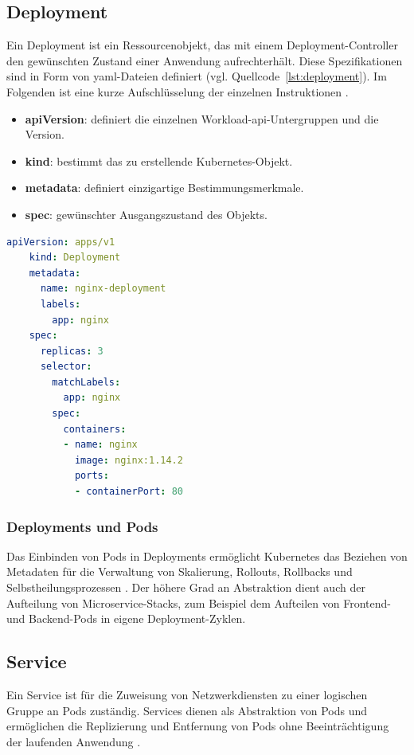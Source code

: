 \subsection{Deployment}
Ein Deployment ist ein Ressourcenobjekt, das mit einem Deployment-Controller den gewünschten Zustand einer Anwendung aufrechterhält.
Diese Spezifikationen sind in Form von \acs{yaml}-Dateien definiert (vgl. Quellcode~\ref{lst:deployment}).
Im Folgenden ist eine kurze Aufschlüsselung der einzelnen Instruktionen \cite{kubernetesobjects}.
\begin{itemize}
    \item \textbf{\acs{api}Version}: definiert die einzelnen Workload-\acs{api}-Untergruppen und die Version.
    \item \textbf{kind}: bestimmt das zu erstellende Kubernetes-Objekt.
    \item \textbf{metadata}: definiert einzigartige Bestimmungsmerkmale.
    \item \textbf{spec}: gewünschter Ausgangszustand des Objekts.
\end{itemize}

\begin{lstlisting}[caption={deployment.yaml \cite{kubernetesdeployment} },captionpos=b,label={lst:deployment},language=yaml]
    apiVersion: apps/v1
    kind: Deployment
    metadata:
      name: nginx-deployment
      labels:
        app: nginx
    spec:
      replicas: 3
      selector:
        matchLabels:
          app: nginx
        spec:
          containers:
          - name: nginx
            image: nginx:1.14.2
            ports:
            - containerPort: 80
    \end{lstlisting}

\subsubsection{Deployments und Pods}
Das Einbinden von Pods in Deployments ermöglicht Kubernetes das Beziehen von Metadaten für die Verwaltung von Skalierung,
Rollouts, Rollbacks und Selbstheilungsprozessen \cite[S.75]{kubernetesnigeldeployments}. Der höhere Grad an Abstraktion
dient auch der Aufteilung von Microservice-Stacks, zum Beispiel dem Aufteilen
von Frontend- und Backend-Pods in eigene Deployment-Zyklen.

\subsection{Service}
Ein Service ist für die Zuweisung von Netzwerkdiensten zu einer logischen Gruppe an Pods zuständig.
Services dienen als Abstraktion von Pods und ermöglichen die Replizierung und Entfernung
von Pods ohne Beeinträchtigung der laufenden Anwendung \cite{kubernetesservice}.


